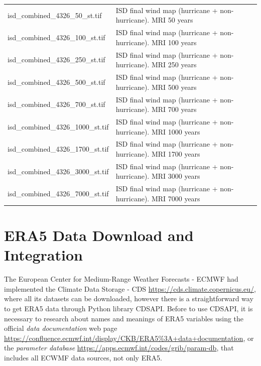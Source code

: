 \documentclass[12pt,oneside]{reedthesis}
\begin{document}
\begin{longtable}[t]{>{\raggedright\arraybackslash}p{2in}>{\raggedright\arraybackslash}p{3.5in}}
isd\_combined\_4326\_50\_st.tif & ISD final wind map (hurricane + non-hurricane). MRI 50 years\\
isd\_combined\_4326\_100\_st.tif & ISD final wind map (hurricane + non-hurricane). MRI 100 years\\
isd\_combined\_4326\_250\_st.tif & ISD final wind map (hurricane + non-hurricane). MRI 250 years\\
isd\_combined\_4326\_500\_st.tif & ISD final wind map (hurricane + non-hurricane). MRI 500 years\\
isd\_combined\_4326\_700\_st.tif & ISD final wind map (hurricane + non-hurricane). MRI 700 years\\
isd\_combined\_4326\_1000\_st.tif & ISD final wind map (hurricane + non-hurricane). MRI 1000 years\\
isd\_combined\_4326\_1700\_st.tif & ISD final wind map (hurricane + non-hurricane). MRI 1700 years\\
isd\_combined\_4326\_3000\_st.tif & ISD final wind map (hurricane + non-hurricane). MRI 3000 years\\
isd\_combined\_4326\_7000\_st.tif & ISD final wind map (hurricane + non-hurricane). MRI 7000 years\\
\bottomrule
\end{longtable}
\endgroup{}

\hypertarget{era5download}{%
\chapter{ERA5 Data Download and Integration}\label{era5download}}

The European Center for Medium-Range Weather Forecasts - ECMWF had implemented the Climate Data Storage - CDS \url{https://cds.climate.copernicus.eu/}, where all its datasets can be downloaded, however there is a straightforward way to get ERA5 data through Python library CDSAPI. Before to use CDSAPI, it is necessary to research about names and meanings of ERA5 variables using the official \emph{data documentation} web page \url{https://confluence.ecmwf.int/display/CKB/ERA5\%3A+data+documentation}, or the \emph{parameter database} \url{https://apps.ecmwf.int/codes/grib/param-db}, that includes all ECWMF data sources, not only ERA5.
\end{document}
